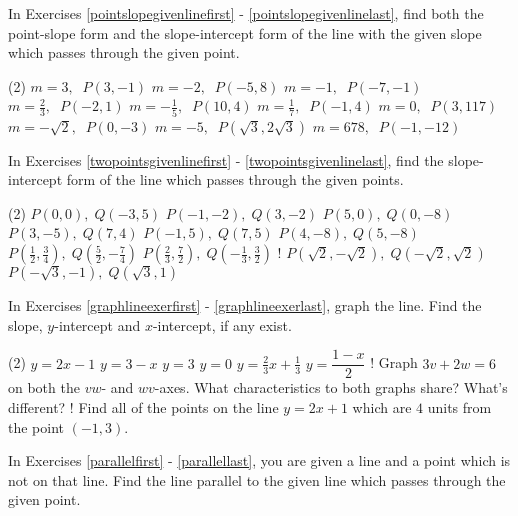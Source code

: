 \label{ExercisesforAppLines}

In Exercises \ref{pointslopegivenlinefirst} - \ref{pointslopegivenlinelast}, find both the point-slope form and the slope-intercept form of the line with the given slope which passes through the given point.

\begin{tasks}(2)
\task $m = 3, \;\; P(3, -1)$ \label{pointslopegivenlinefirst}
\task $m = -2, \;\; P(-5, 8)$
\task $m = -1, \;\; P(-7, -1)$
\task $m = \frac{2}{3}, \;\; P(-2, 1)$
\task $m = -\frac{1}{5}, \;\; P(10, 4)$
\task $m = \frac{1}{7}, \;\; P(-1, 4)$
\task $m = 0, \;\; P(3, 117)$
\task $m = -\sqrt{2}, \;\; P(0, -3)$
\task $m = -5, \;\; P(\sqrt{3}, 2\sqrt{3})$
\task $m = 678, \;\; P(-1, -12)$ \label{pointslopegivenlinelast}
\end{tasks}

In Exercises \ref{twopointsgivenlinefirst} - \ref{twopointsgivenlinelast}, find the slope-intercept form of the line which passes through the given points.

\begin{tasks}[resume](2)
\task $P(0, 0), \; Q(-3, 5)$ \label{twopointsgivenlinefirst}
\task $P(-1, -2), \; Q(3, -2)$
\task $P(5, 0), \; Q(0, -8)$
\task $P(3, -5), \; Q(7, 4)$
\task $P(-1,5), \; Q(7, 5)$
\task $P(4, -8), \; Q(5, -8)$
\task $P\left(\frac{1}{2}, \frac{3}{4} \right), \; Q\left(\frac{5}{2}, -\frac{7}{4} \right)$
\task $P\left(\frac{2}{3}, \frac{7}{2} \right), \; Q\left(-\frac{1}{3}, \frac{3}{2} \right)$
\task! $P\left(\sqrt{2}, -\sqrt{2} \right), \; Q\left(-\sqrt{2}, \sqrt{2} \right)$
\task $P\left(-\sqrt{3}, -1 \right), \; Q\left(\sqrt{3}, 1 \right)$ \label{twopointsgivenlinelast}
\end{tasks}

In Exercises \ref{graphlineexerfirst} - \ref{graphlineexerlast}, graph the line.  Find the slope, $y$-intercept and $x$-intercept, if any exist.

\begin{tasks}[resume](2)
\task $y = 2x - 1$ \label{graphlineexerfirst}
\task $y = 3 - x$
\task $y = 3$
\task $y = 0$
\task $y = \frac{2}{3} x + \frac{1}{3}$ 
\task $y = \dfrac{1-x}{2}$ \label{graphlineexerlast}
\task!  Graph $3v + 2w = 6$ on both the $vw$- and $wv$-axes.  What characteristics to both graphs share?  What's different?
\task!  Find all of the points on the line $y=2x+1$ which are $4$ units from the point $(-1,3)$.
\end{tasks}

In Exercises \ref{parallelfirst} - \ref{parallellast}, you are given a line and a point which is not on that line.  Find the line parallel to the given line which passes through the given point.

